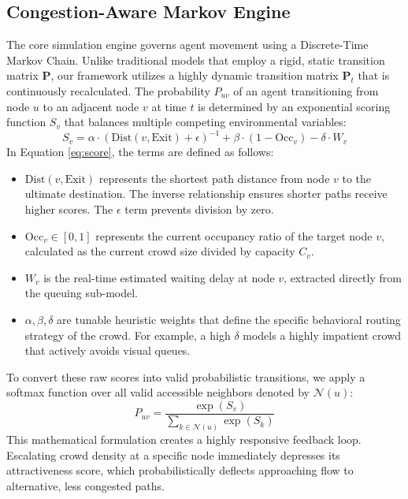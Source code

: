 \documentclass[conference]{IEEEtran}
\begin{document}
\subsection{Congestion-Aware Markov Engine}
The core simulation engine governs agent movement using a Discrete-Time Markov Chain. Unlike traditional models that employ a rigid, static transition matrix $\mathbf{P}$, our framework utilizes a highly dynamic transition matrix $\mathbf{P}_t$ that is continuously recalculated. The probability $P_{uv}$ of an agent transitioning from node $u$ to an adjacent node $v$ at time $t$ is determined by an exponential scoring function $S_v$ that balances multiple competing environmental variables:
\begin{equation}
S_v = \alpha \cdot \left(\text{Dist}(v, \text{Exit}) + \epsilon\right)^{-1} + \beta \cdot (1 - \text{Occ}_v) - \delta \cdot W_v
\label{eq:score}
\end{equation}
In Equation \ref{eq:score}, the terms are defined as follows:
\begin{itemize}
    \item $\text{Dist}(v, \text{Exit})$ represents the shortest path distance from node $v$ to the ultimate destination. The inverse relationship ensures shorter paths receive higher scores. The $\epsilon$ term prevents division by zero.
    \item $\text{Occ}_v \in [0, 1]$ represents the current occupancy ratio of the target node $v$, calculated as the current crowd size divided by capacity $C_v$.
    \item $W_v$ is the real-time estimated waiting delay at node $v$, extracted directly from the queuing sub-model.
    \item $\alpha, \beta, \delta$ are tunable heuristic weights that define the specific behavioral routing strategy of the crowd. For example, a high $\delta$ models a highly impatient crowd that actively avoids visual queues.
\end{itemize}
To convert these raw scores into valid probabilistic transitions, we apply a softmax function over all valid accessible neighbors denoted by $\mathcal{N}(u)$:
\begin{equation}
P_{uv} = \frac{\exp(S_v)}{\sum_{k \in \mathcal{N}(u)} \exp(S_k)}
\end{equation}
This mathematical formulation creates a highly responsive feedback loop. Escalating crowd density at a specific node immediately depresses its attractiveness score, which probabilistically deflects approaching flow to alternative, less congested paths.
\end{document}
